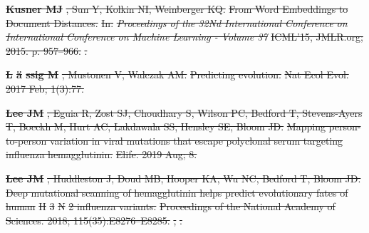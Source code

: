 \documentclass[9pt,lineno]{elife} %
\providecommand{\DIFdel}[1]{{\protect\color{red}\sout{#1}}}                      %
\providecommand{\DIFdeltex}[1]{{\protect\color{red}\sout{#1}}}                      %
\providecommand{\DIFdel}[1]{\texorpdfstring{\DIFdeltex{#1}}{}} %
\begin{document}
\textbf{%
\DIFdel{Kusner MJ}}%
\DIFdel{, Sun Y, Kolkin NI, Weinberger KQ.
}%
\DIFdel{From Word Embeddings to Document Distances.
}%
\DIFdel{In: }\emph{\DIFdel{Proceedings of the 32Nd International Conference on
  International Conference on Machine Learning - Volume 37}} %
\DIFdel{ICML'15, JMLR.org;
  2015. p. 957--966.
}%
\DIFdel{.
}%

\textbf{%
\DIFdel{L}%
\DIFdel{\"a}%
\DIFdel{ssig M}}%
\DIFdel{, Mustonen V, Walczak AM.
}%
\DIFdel{Predicting evolution.}%
\DIFdel{Nat Ecol Evol.  2017 Feb; 1(3):77.
}%

\textbf{%
\DIFdel{Lee JM}}%
\DIFdel{, Eguia R, Zost SJ, Choudhary S, Wilson
  PC, Bedford T, Stevens-Ayers T, Boeckh M, Hurt AC, Lakdawala SS, Hensley SE,
  Bloom JD.
}%
\DIFdel{Mapping person-to-person variation in viral mutations that escape
  polyclonal serum targeting influenza hemagglutinin.}%
\DIFdel{Elife.  2019 Aug; 8.
}%

\textbf{%
\DIFdel{Lee JM}}%
\DIFdel{, Huddleston J, Doud MB, Hooper KA, Wu
  NC, Bedford T, Bloom JD.
}%
\DIFdel{Deep mutational scanning of hemagglutinin helps predict evolutionary
  fates of human }%
\DIFdel{H}%
\DIFdel{3}%
\DIFdel{N}%
\DIFdel{2 influenza variants.
}%
\DIFdel{Proceedings of the National Academy of Sciences.  2018;
  115(35):E8276--E8285.
}%
\DIFdel{,
  }%
\DIFdel{.
}%
\end{document}

